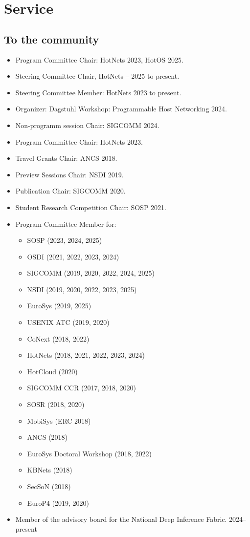 \documentclass[11pt,letterpaper,sans]{moderncv}        %
\begin{document}
\section{Service}
\subsection{To the community}
\begin{itemize}
    \item Program Committee Chair: HotNets 2023, HotOS 2025.
    \item Steering Committee Chair, HotNets -- 2025 to present.
    \item Steering Committee Member: HotNets 2023 to present.
    \item Organizer: Dagstuhl Workshop: Programmable Host Networking
        2024.
    \item Non-programm session Chair: SIGCOMM 2024.
    \item Program Committee Chair: HotNets 2023.
    \item Travel Grants Chair: ANCS 2018.
    \item Preview Sessions Chair: NSDI 2019.
    \item Publication Chair: SIGCOMM 2020. 
    \item Student Research Competition Chair: SOSP 2021. 
    \item Program Committee Member for:
        \begin{itemize}
            \item SOSP (2023, 2024, 2025)
            \item OSDI (2021, 2022, 2023, 2024)
            \item SIGCOMM (2019, 2020, 2022, 2024, 2025)
            \item NSDI (2019, 2020, 2022, 2023, 2025)
            \item EuroSys (2019, 2025)
            \item USENIX ATC (2019, 2020)
            \item CoNext (2018, 2022)
            \item HotNets (2018, 2021, 2022, 2023, 2024)
            \item HotCloud (2020)
            \item SIGCOMM CCR (2017, 2018, 2020)
            \item SOSR (2018, 2020)
            \item MobiSys (ERC 2018)
            \item ANCS (2018)
            \item EuroSys Doctoral Workshop (2018, 2022)
            \item KBNets (2018)
            \item SecSoN (2018)
            \item EuroP4 (2019, 2020)
        \end{itemize}
    \item Member of the advisory board for the National Deep Inference Fabric. 2024--present
\end{itemize}
\end{document}
